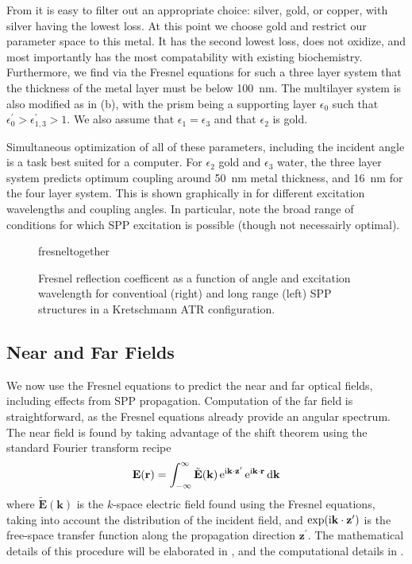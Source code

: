 From  it is easy to filter out an appropriate
choice: silver, gold, or copper, with silver having the lowest loss.  At
this point we choose gold and restrict our parameter space to this metal.
It has the second lowest loss, does not oxidize, and most importantly has
the most compatability with existing biochemistry.  Furthermore, we find
via the Fresnel equations for such a three layer system that the thickness
of the metal layer must be below \SI{100}{\nano\meter}.  The multilayer
system is also modified as in (b), with the
prism being a supporting layer $\epsilon_0$ such that
$\epsilon^\prime_0>\epsilon^\prime_{1,3}>1$.  We also assume that
$\epsilon_1=\epsilon_3$ and that $\epsilon_2$ is gold.

Simultaneous optimization of all of these parameters, including the
incident angle is a task best suited for a computer.  For $\epsilon_2$ gold
and $\epsilon_3$ water, the three layer system predicts optimum coupling
around \SI{50}{\nano\meter} metal thickness, and \SI{16}{\nano\meter} for
the four layer system.  This is shown graphically in
 for different excitation wavelengths and coupling
angles.  In particular, note the broad range of conditions for which SPP
excitation is possible (though not necessairly optimal).

\begin{figure}[ht]
\centering
{fresneltogether}
\caption{Fresnel reflection coefficent as a function of angle and
excitation wavelength for conventioal (right) and long range (left) SPP structures in a Kretschmann ATR 
configuration.}
\label{fig:fresnelangle}
\end{figure}

\subsection{Near and Far Fields}

We now use the Fresnel equations to predict the near and far optical
fields, including effects from SPP propagation.  Computation of the far
field is straightforward, as the Fresnel equations already provide an
angular spectrum.  The near field is found by taking advantage of the shift
theorem using the standard Fourier transform recipe
\begin{equation}
\mathbf{E}(\mathbf{r}) = \int_{-\infty}^{\infty} \tilde{\mathbf{E}}(\mathbf{k})
\,{\mathrm{e}}^{{\mathrm{i}} \mathbf{k} \cdot \mathbf{z}^\prime}
\,{\mathrm{e}}^{{\mathrm{i}} \mathbf{k} \cdot \mathbf{r}}\,\mathrm{d} \mathbf{k}
\end{equation}
where $\tilde{\mathbf{E}}(\mathbf{k})$ is the $k$-space electric field
found using the Fresnel equations, taking into account the distribution of
the incident field, and $\exp({\mathrm{i}} \mathbf{k} \cdot
\mathbf{z}^\prime)$ is the free-space transfer function along the 
propagation direction $\mathbf{z}^\prime$.  The mathematical details of this procedure
will be elaborated in , and the
computational details in .

